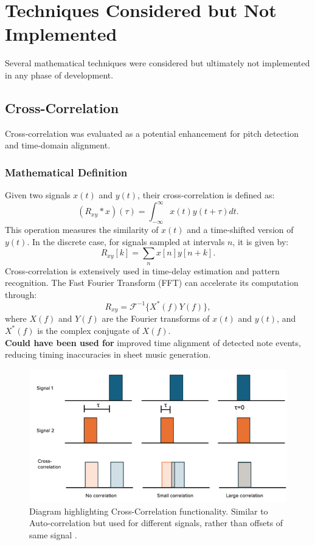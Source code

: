 \documentclass{article}
\begin{document}
\newpage

\section{Techniques Considered but Not Implemented}
Several mathematical techniques were considered but ultimately not implemented in any phase of development.

\subsection{Cross-Correlation}
Cross-correlation was evaluated as a potential enhancement for pitch detection and time-domain alignment.

\subsubsection{Mathematical Definition}
Given two signals $x(t)$ and $y(t)$, their cross-correlation is defined as:
\begin{equation}
(R_{xy} \ast x)(\tau) = \int_{-\infty}^{\infty} x(t) y(t + \tau) dt.
\end{equation}
This operation measures the similarity of $x(t)$ and a time-shifted version of $y(t)$. In the discrete case, for signals sampled at intervals $n$, it is given by:
\begin{equation}
R_{xy}[k] = \sum_{n} x[n] y[n+k].
\end{equation}
Cross-correlation is extensively used in time-delay estimation and pattern recognition. The Fast Fourier Transform (FFT) can accelerate its computation through:
\begin{equation}
R_{xy} = \mathcal{F}^{-1} \{ X^*(f) Y(f) \},
\end{equation}
where $X(f)$ and $Y(f)$ are the Fourier transforms of $x(t)$ and $y(t)$, and $X^*(f)$ is the complex conjugate of $X(f)$. \\

\textbf{Could have been used for} improved time alignment of detected note events, reducing timing inaccuracies in sheet music generation.

\begin{figure}[H]
\includegraphics[width=\textwidth,scale=0.5]{images/cross-correlation-example.png}
\caption{Diagram highlighting Cross-Correlation functionality. Similar to Auto-correlation but used for different signals, rather than offsets of same signal \cite{CrossCorrelation}.}
\end{figure}
\end{document}
